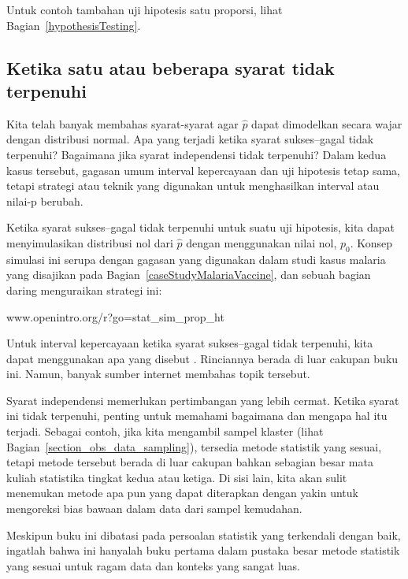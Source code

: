 \noindent%
Untuk contoh tambahan uji hipotesis satu proporsi,
lihat Bagian~\ref{hypothesisTesting}.




\subsection{Ketika satu atau beberapa syarat tidak terpenuhi}

Kita telah banyak membahas syarat-syarat agar
$\hat{p}$ dapat dimodelkan secara wajar dengan distribusi normal.
Apa yang terjadi ketika syarat sukses--gagal tidak terpenuhi?
Bagaimana jika syarat independensi tidak terpenuhi?
Dalam kedua kasus tersebut, gagasan umum interval kepercayaan
dan uji hipotesis tetap sama, tetapi strategi
atau teknik yang digunakan untuk menghasilkan interval atau nilai-p
berubah.

Ketika syarat sukses--gagal tidak terpenuhi
untuk suatu uji hipotesis, kita dapat menyimulasikan distribusi nol
dari $\hat{p}$ dengan menggunakan nilai nol, $p_0$.
Konsep simulasi ini serupa dengan gagasan yang digunakan
dalam studi kasus malaria yang disajikan pada
Bagian~\ref{caseStudyMalariaVaccine},
dan sebuah bagian daring menguraikan strategi ini:
\begin{center}
    {www.openintro.org/r?go=stat\_sim\_prop\_ht}
\end{center}
Untuk interval kepercayaan ketika syarat sukses--gagal
tidak terpenuhi, kita dapat menggunakan apa yang disebut
.
Rinciannya berada di luar cakupan buku ini.
Namun, banyak sumber internet membahas
topik tersebut.

Syarat independensi memerlukan pertimbangan yang lebih cermat.
Ketika syarat ini tidak terpenuhi, penting untuk memahami bagaimana dan mengapa
hal itu terjadi.
Sebagai contoh, jika kita mengambil sampel klaster
(lihat Bagian~\ref{section_obs_data_sampling}),
tersedia metode statistik yang sesuai, tetapi metode tersebut
berada di luar cakupan bahkan sebagian besar mata kuliah statistika
tingkat kedua atau ketiga.
Di sisi lain, kita akan sulit menemukan metode apa pun
yang dapat diterapkan dengan yakin untuk mengoreksi bias bawaan
dalam data dari sampel kemudahan.

Meskipun buku ini dibatasi pada persoalan statistik
yang terkendali dengan baik, ingatlah bahwa ini hanyalah buku pertama
dalam pustaka besar metode statistik yang
sesuai untuk ragam data dan konteks yang sangat luas.


